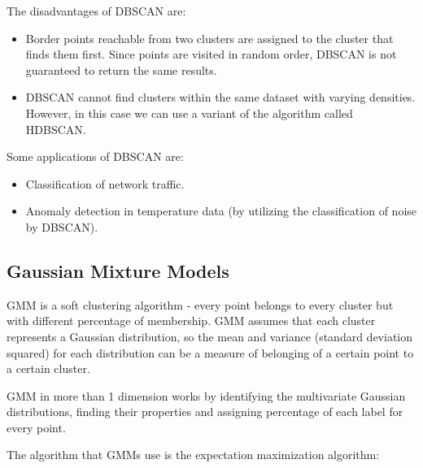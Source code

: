 \documentclass{article}
\begin{document}
The disadvantages of DBSCAN are:

\begin{itemize}
  \item Border points reachable from two clusters are assigned to the cluster that finds them first. Since points are visited in random order, DBSCAN is not guaranteed to return the same results.
  \item DBSCAN cannot find clusters within the same dataset with varying densities. However, in this case we can use a variant of the algorithm called HDBSCAN.
\end{itemize}

Some applications of DBSCAN are:

\begin{itemize}
  \item Classification of network traffic.
  \item Anomaly detection in temperature data (by utilizing the classification of noise by DBSCAN).
\end{itemize}

\subsection{Gaussian Mixture Models}
GMM is a soft clustering algorithm - every point belongs to every cluster but with different percentage of membership. GMM assumes that each cluster represents a Gaussian distribution, so the mean and variance (standard deviation squared) for each distribution can be a measure of belonging of a certain point to a certain cluster.

GMM in more than 1 dimension works by identifying the multivariate Gaussian distributions, finding their properties and assigning percentage of each label for every point.

The algorithm that GMMs use is the expectation maximization algorithm:
\end{document}

